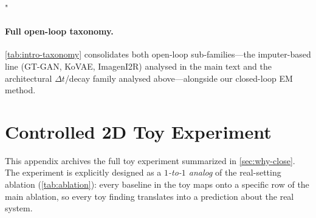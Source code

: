 "\documentclass{article}
\theoremstyle{plain}
\theoremstyle{definition}
\theoremstyle{remark}
\begin{document}
\paragraph{Full open-loop taxonomy.}
\cref{tab:intro-taxonomy} consolidates both open-loop sub-families---the imputer-based line (GT-GAN, KoVAE, ImagenI2R) analysed in the main text and the architectural $\Delta t$/decay family analysed above---alongside our closed-loop EM method.

\begin{table}[t]
\centering
\caption{Existing paradigms for irregular time-series generation: all published methods follow an open-loop design (imputer-based or architectural). Our work closes the loop via co-evolving EM.}
\label{tab:intro-taxonomy}
\end{table}

\section{Controlled 2D Toy Experiment}
\label{app:toy}

This appendix archives the full toy experiment summarized in \cref{sec:why-close}. The experiment is explicitly designed as a \emph{$1$-to-$1$ analog} of the real-setting ablation (\cref{tab:ablation}): every baseline in the toy maps onto a specific row of the main ablation, so every toy finding translates into a prediction about the real system.
\end{document}
